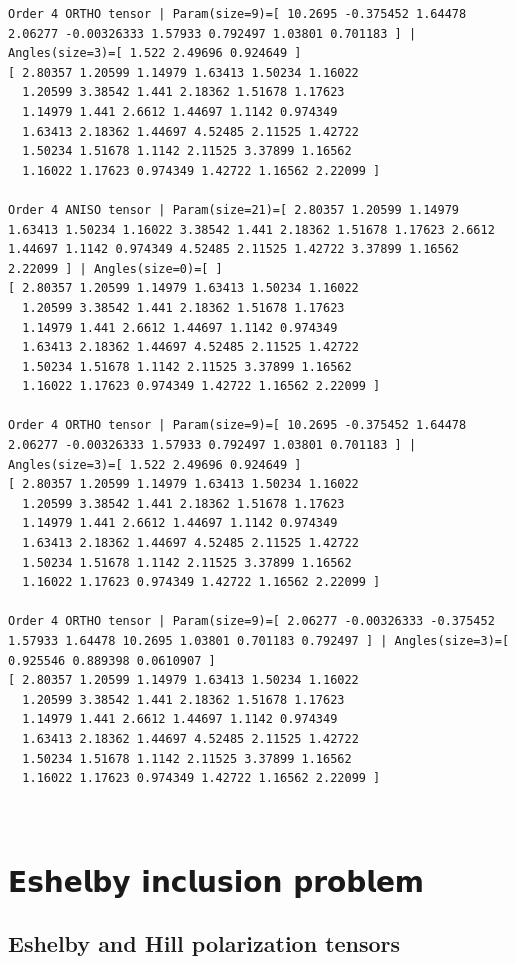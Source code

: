 \documentclass[
  letterpaper,
  DIV=11,
  numbers=noendperiod]{scrreprt}
\begin{document}
\begin{tcolorbox}
\begin{verbatim}
Order 4 ORTHO tensor | Param(size=9)=[ 10.2695 -0.375452 1.64478 2.06277 -0.00326333 1.57933 0.792497 1.03801 0.701183 ] | Angles(size=3)=[ 1.522 2.49696 0.924649 ]
[ 2.80357 1.20599 1.14979 1.63413 1.50234 1.16022 
  1.20599 3.38542 1.441 2.18362 1.51678 1.17623 
  1.14979 1.441 2.6612 1.44697 1.1142 0.974349 
  1.63413 2.18362 1.44697 4.52485 2.11525 1.42722 
  1.50234 1.51678 1.1142 2.11525 3.37899 1.16562 
  1.16022 1.17623 0.974349 1.42722 1.16562 2.22099 ]

Order 4 ANISO tensor | Param(size=21)=[ 2.80357 1.20599 1.14979 1.63413 1.50234 1.16022 3.38542 1.441 2.18362 1.51678 1.17623 2.6612 1.44697 1.1142 0.974349 4.52485 2.11525 1.42722 3.37899 1.16562 2.22099 ] | Angles(size=0)=[ ]
[ 2.80357 1.20599 1.14979 1.63413 1.50234 1.16022 
  1.20599 3.38542 1.441 2.18362 1.51678 1.17623 
  1.14979 1.441 2.6612 1.44697 1.1142 0.974349 
  1.63413 2.18362 1.44697 4.52485 2.11525 1.42722 
  1.50234 1.51678 1.1142 2.11525 3.37899 1.16562 
  1.16022 1.17623 0.974349 1.42722 1.16562 2.22099 ]

Order 4 ORTHO tensor | Param(size=9)=[ 10.2695 -0.375452 1.64478 2.06277 -0.00326333 1.57933 0.792497 1.03801 0.701183 ] | Angles(size=3)=[ 1.522 2.49696 0.924649 ]
[ 2.80357 1.20599 1.14979 1.63413 1.50234 1.16022 
  1.20599 3.38542 1.441 2.18362 1.51678 1.17623 
  1.14979 1.441 2.6612 1.44697 1.1142 0.974349 
  1.63413 2.18362 1.44697 4.52485 2.11525 1.42722 
  1.50234 1.51678 1.1142 2.11525 3.37899 1.16562 
  1.16022 1.17623 0.974349 1.42722 1.16562 2.22099 ]

Order 4 ORTHO tensor | Param(size=9)=[ 2.06277 -0.00326333 -0.375452 1.57933 1.64478 10.2695 1.03801 0.701183 0.792497 ] | Angles(size=3)=[ 0.925546 0.889398 0.0610907 ]
[ 2.80357 1.20599 1.14979 1.63413 1.50234 1.16022 
  1.20599 3.38542 1.441 2.18362 1.51678 1.17623 
  1.14979 1.441 2.6612 1.44697 1.1142 0.974349 
  1.63413 2.18362 1.44697 4.52485 2.11525 1.42722 
  1.50234 1.51678 1.1142 2.11525 3.37899 1.16562 
  1.16022 1.17623 0.974349 1.42722 1.16562 2.22099 ]
\end{verbatim}

\end{tcolorbox}

\(\,\)

\part{𝗘𝘀𝗵𝗲𝗹𝗯𝘆 𝗶𝗻𝗰𝗹𝘂𝘀𝗶𝗼𝗻 𝗽𝗿𝗼𝗯𝗹𝗲𝗺}

\chapter{Eshelby and Hill polarization tensors}\label{sec-eshelby_hill}
\end{document}
